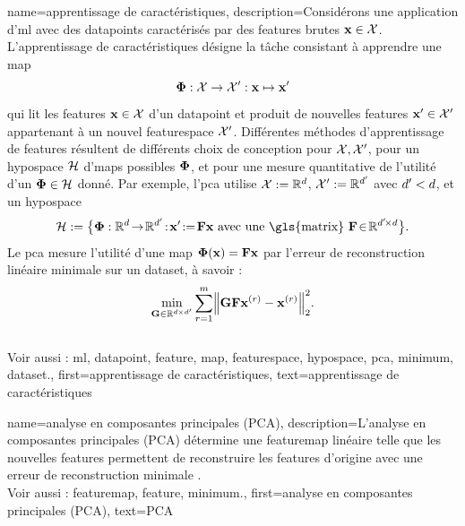 {name={apprentissage de caractéristiques},
	description={Considérons une application d'\gls{ml} avec des \glspl{datapoint} caractérisés par 
		des \glspl{feature} brutes ${\bf x} \in \mathcal{X}$. L'apprentissage de caractéristiques 
		désigne la tâche consistant à apprendre une \gls{map}
		$$
		{\bf \Phi}: \mathcal{X} \rightarrow \mathcal{X}': {\bf x} \mapsto {\bf x}'
		$$ 
		qui lit les \glspl{feature} ${\bf x} \in \mathcal{X}$ d’un \gls{datapoint} et produit de 
		nouvelles \glspl{feature} ${\bf x}' \in \mathcal{X}'$ appartenant à un nouvel \gls{featurespace} $\mathcal{X}'$. 
		Différentes méthodes d'apprentissage de \glspl{feature} résultent de différents choix de conception pour 
		$\mathcal{X}, \mathcal{X}'$, pour un \gls{hypospace} $\mathcal{H}$ 
		d'\glspl{map} possibles ${\bf \Phi}$, et pour une mesure quantitative 
		de l’utilité d’un ${\bf \Phi} \in \mathcal{H}$ donné. Par exemple, l'\gls{pca} 
		utilise $\mathcal{X} := \mathbb{R}^{d}$, $\mathcal{X}' := \mathbb{R}^{d'}$ 
		avec $d' < d$, et un \gls{hypospace}
		$$
		\hypospace\defeq \big\{ \featuremapvec: \mathbb{R}^{\dimlocalmodel}
		\!\rightarrow\! \mathbb{R}^{\dimlocalmodel'}\!:\!\featurevec'\!\defeq\!\mF \featurevec \mbox{ avec une \gls{matrix} } \mF \!\in\! \mathbb{R}^{\dimlocalmodel' \!\times \dimlocalmodel} \big\}.
		$$
		Le \gls{pca} mesure l'utilité d'une \gls{map} ${\bf \Phi}({\bf x})= \mathbf{F} {\bf x}$ 
		par l’erreur de reconstruction linéaire minimale sur un \gls{dataset}, à savoir :
		$$
		\min_{\mG \in \mathbb{R}^{\dimlocalmodel \!\!\!\times \dimlocalmodel'}} \sum_{\sampleidx=1}^{\samplesize} \normgeneric{\mG \mF \featurevec^{(\sampleidx)} - \featurevec^{(\sampleidx)}}{2}^{2}.
		$$
		\\
		Voir aussi : \gls{ml}, \gls{datapoint}, \gls{feature}, \gls{map}, \gls{featurespace}, \gls{hypospace}, \gls{pca}, \gls{minimum}, \gls{dataset}.},
	first={apprentissage de caractéristiques},
	text={apprentissage de caractéristiques}
}

{name={analyse en composantes principales (PCA)}, 
	description={L’analyse en composantes principales (PCA) 
		détermine une \gls{featuremap} linéaire telle que les nouvelles \glspl{feature} 
		permettent de reconstruire les \glspl{feature} d’origine avec une erreur de reconstruction minimale \cite{MLBasics}.
		\\
		Voir aussi : \gls{featuremap}, \gls{feature}, \gls{minimum}.},
	first={analyse en composantes principales (PCA)},
	text={PCA} 
}


